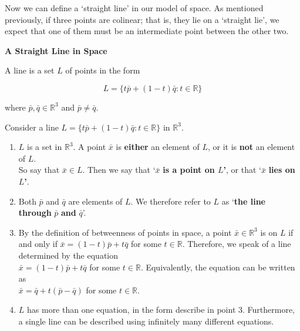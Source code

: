 Now we can define a `straight line' in our model of space. As mentioned previously, if 
three points are colinear; that is, they lie on a `straight lie', we expect that one of them
must be an intermediate point between the other two.

\begin{definitionbox}
\textbf{A Straight Line in Space}

  A line is a set $L$ of points in the form

  \[
    L = \{t\bar{p} + (1 - t)\bar{q} : t \in \mathbb{R} \}
  \]

  where $\bar{p}, \bar{q} \in \mathbb{R}^3$ and $\bar{p} \neq \bar{q}$.

\end{definitionbox}

\begin{notebox}

  Consider a line $L = \{t\bar{p} + (1 - t)\bar{q} : t \in \mathbb{R}\}$ in $\mathbb{R}^3$.

  \begin{enumerate}
    \item $L$ is a set in $\mathbb{R}^3$. A point $\bar{x}$ is \textbf{either} an element of $L$, or it is \textbf{not} an element of $L$.\\
          So say that $\bar{x} \in L.$ Then we say that `$\bar{x}$ \textbf{is a point on $L$'}, or that `$\bar{x}$ \textbf{lies on $L$'}.

    \item Both $\bar{p}$ and $\bar{q}$ are elements of $L$. We therefore refer to $L$ as `\textbf{the line through} $\bar{p}$ \textbf{and} $\bar{q}$'.
    
    \item By the definition of betweenness of points in space, a point $\bar{x} \in \mathbb{R}^3$ is on $L$ if and only if
          $\bar{x} = (1 - t)\bar{p} + t\bar{q}$ for some $t \in \mathbb{R}$. Therefore, we speak of a line determined by the equation \\
          $\bar{x} = (1 - t)\bar{p} + t\bar{q}$ for some $t \in \mathbb{R}$.
          Equivalently, the equation can be written as \\
          $\bar{x} = \bar{q} + t(\bar{p} - \bar{q})$ for some $t \in \mathbb{R}$.

    \item $L$ has more than one equation, in the form describe in point 3. Furthermore, a single
     line can be described using infinitely many different equations.

  \end{enumerate}
\end{notebox}

